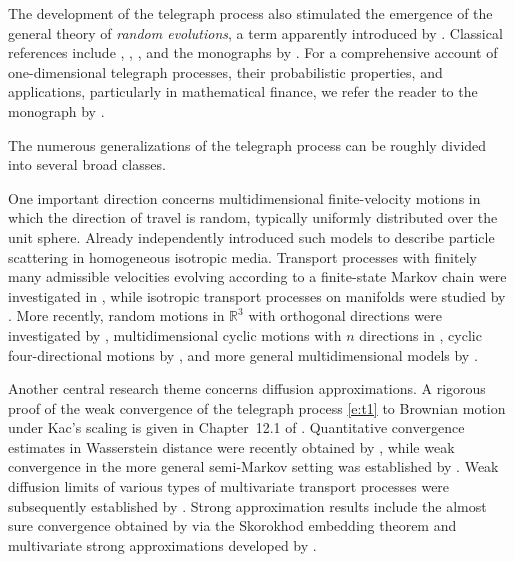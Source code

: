 \documentclass[10pt]{article}
\newcommand{\1}{1\!\!\!\;{\rm I}}
\theoremstyle{plain}
\theoremstyle{definition}
\numberwithin{equation}{section}
\begin{document}
The development of the telegraph process also stimulated the emergence of the general
theory of \emph{random evolutions}, a term apparently introduced by \cite{griego1969random,griego1971theory}.
Classical references include \cite{hersh1974random}, \cite[Chapter~12]{EthierK-86},
\cite{pinsky1991lectures}, and the monographs by \cite{swishchuk1997random,swishchuk2000random}.
For a comprehensive account of one-dimensional telegraph processes, their probabilistic properties,
and applications, particularly in mathematical finance, we refer the reader to the monograph by
\cite{kolesnik2013telegraph}.


The numerous generalizations of the telegraph process can be roughly divided into several broad classes.

One important direction concerns multidimensional finite-velocity motions in which the direction of travel is random,
typically uniformly distributed over the unit sphere. Already \cite{monin1956statistical} independently
introduced such models to describe particle scattering in homogeneous isotropic media.
Transport processes with finitely many admissible velocities evolving according to
a finite-state Markov chain were investigated in \cite{pinsky1968differential,kurtz1973limit},
while isotropic transport processes on manifolds were studied by \cite{pinsky1976isotropic}.
More recently, random motions in $\mathbb{R}^3$ with orthogonal directions were investigated by \cite{cinque2023random},
multidimensional cyclic motions with $n$ directions in \cite{lachal2006cyclic,lachal2006minimal},
cyclic four-directional motions by \cite{leorato2003alternating,orsingher2004cyclic,iuliano2024cyclic},
and more general multidimensional models by \cite{cinque2024multidimensional}.

Another central research theme concerns diffusion approximations. A rigorous proof of the weak convergence of the telegraph
process \eqref{e:t1} to Brownian motion under Kac's scaling is given in Chapter~12.1 of \cite{EthierK-86}.
Quantitative convergence estimates in Wasserstein distance were recently obtained by \cite{barrera2023quantitative},
while weak convergence in the more general semi-Markov setting was established by \cite{pedicone2026weak}.
Weak diffusion limits of various types of multivariate transport processes
were subsequently established by
\cite{watanabe1968weak,watanabe1970convergence,pinsky1968differential,kurtz1973limit,
tutubalin1967central,gorostiza1972central,gorostiza1973invariance,gorostiza1975convergence,othmer1988models,
othmer2000diffusion,othmer2002diffusion,hillen2016diffusion}.
Strong approximation results include the almost sure convergence obtained by \cite{Griego71}
via the Skorokhod embedding theorem and multivariate strong approximations developed by \cite{bashtova2025strong}.
\end{document}
